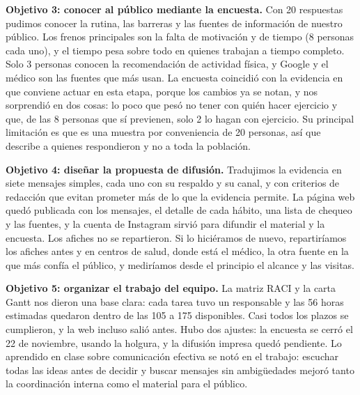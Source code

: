 \documentclass[12pt, letterpaper, table, xcdraw]{extarticle}
\begin{document}
\textbf{Objetivo 3: conocer al público mediante la encuesta.} Con 20 respuestas pudimos conocer la rutina, las barreras y las fuentes de información de nuestro público. Los frenos principales son la falta de motivación y de tiempo (8 personas cada uno), y el tiempo pesa sobre todo en quienes trabajan a tiempo completo. Solo 3 personas conocen la recomendación de actividad física, y Google y el médico son las fuentes que más usan. La encuesta coincidió con la evidencia en que conviene actuar en esta etapa, porque los cambios ya se notan, y nos sorprendió en dos cosas: lo poco que pesó no tener con quién hacer ejercicio y que, de las 8 personas que sí previenen, solo 2 lo hagan con ejercicio. Su principal limitación es que es una muestra por conveniencia de 20 personas, así que describe a quienes respondieron y no a toda la población.

\textbf{Objetivo 4: diseñar la propuesta de difusión.} Tradujimos la evidencia en siete mensajes simples, cada uno con su respaldo y su canal, y con criterios de redacción que evitan prometer más de lo que la evidencia permite. La página web quedó publicada con los mensajes, el detalle de cada hábito, una lista de chequeo y las fuentes, y la cuenta de Instagram sirvió para difundir el material y la encuesta. Los afiches no se repartieron. Si lo hiciéramos de nuevo, repartiríamos los afiches antes y en centros de salud, donde está el médico, la otra fuente en la que más confía el público, y mediríamos desde el principio el alcance y las visitas.

\textbf{Objetivo 5: organizar el trabajo del equipo.} La matriz RACI y la carta Gantt nos dieron una base clara: cada tarea tuvo un responsable y las 56 horas estimadas quedaron dentro de las 105 a 175 disponibles. Casi todos los plazos se cumplieron, y la web incluso salió antes. Hubo dos ajustes: la encuesta se cerró el 22 de noviembre, usando la holgura, y la difusión impresa quedó pendiente. Lo aprendido en clase sobre comunicación efectiva se notó en el trabajo: escuchar todas las ideas antes de decidir y buscar mensajes sin ambigüedades mejoró tanto la coordinación interna como el material para el público.
\clearpage


{}

\printbibliography[title={Bibliografía}]
\clearpage

\end{document}

